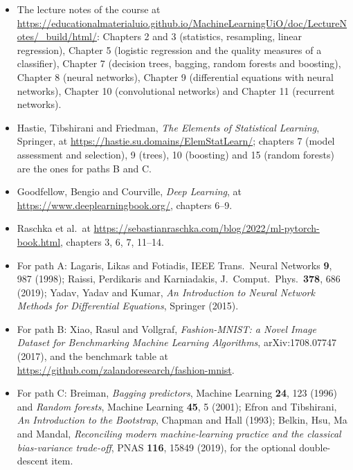 \documentclass[11pt,a4paper]{article}
\begin{document}
\begin{itemize}[nosep]
  \item The lecture notes of the course at
        \url{https://educationalmaterialuio.github.io/MachineLearningUiO/doc/LectureNotes/_build/html/}:
        Chapters 2 and 3 (statistics, resampling, linear regression), Chapter
        5 (logistic regression and the quality measures of a classifier),
        Chapter 7 (decision trees, bagging, random forests and boosting),
        Chapter 8 (neural networks), Chapter 9 (differential equations with
        neural networks), Chapter 10 (convolutional networks) and Chapter 11
        (recurrent networks).
  \item Hastie, Tibshirani and Friedman, \emph{The Elements of Statistical
        Learning}, Springer, at
        \url{https://hastie.su.domains/ElemStatLearn/}; chapters 7 (model
        assessment and selection), 9 (trees), 10 (boosting) and 15 (random
        forests) are the ones for paths B and C.
  \item Goodfellow, Bengio and Courville, \emph{Deep Learning}, at
        \url{https://www.deeplearningbook.org/}, chapters 6--9.
  \item Raschka et al.\ at
        \url{https://sebastianraschka.com/blog/2022/ml-pytorch-book.html},
        chapters 3, 6, 7, 11--14.
  \item For path A: Lagaris, Likas and Fotiadis, IEEE Trans.\ Neural Networks
        \textbf{9}, 987 (1998); Raissi, Perdikaris and Karniadakis, J.\
        Comput.\ Phys.\ \textbf{378}, 686 (2019); Yadav, Yadav and Kumar,
        \emph{An Introduction to Neural Network Methods for Differential
        Equations}, Springer (2015).
  \item For path B: Xiao, Rasul and Vollgraf, \emph{Fashion-MNIST: a Novel
        Image Dataset for Benchmarking Machine Learning Algorithms},
        arXiv:1708.07747 (2017), and the benchmark table at
        \url{https://github.com/zalandoresearch/fashion-mnist}.
  \item For path C: Breiman, \emph{Bagging predictors}, Machine Learning
        \textbf{24}, 123 (1996) and \emph{Random forests}, Machine Learning
        \textbf{45}, 5 (2001); Efron and Tibshirani, \emph{An Introduction to
        the Bootstrap}, Chapman and Hall (1993); Belkin, Hsu, Ma and Mandal,
        \emph{Reconciling modern machine-learning practice and the classical
        bias-variance trade-off}, PNAS \textbf{116}, 15849 (2019), for the
        optional double-descent item.
\end{itemize}
\end{document}
